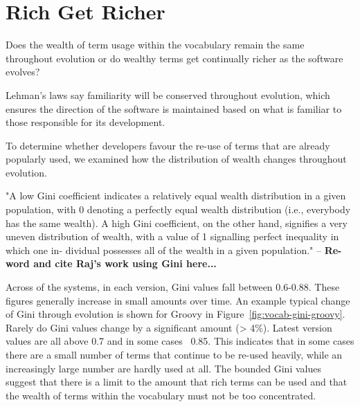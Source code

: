 

\section{Rich Get Richer} %
\label{sec:rich_get_richer}

Does the wealth of term usage within the vocabulary remain the same throughout evolution or do wealthy terms get continually richer as the software evolves?

Lehman's laws say familiarity will be conserved throughout evolution, which ensures the direction of the software is maintained based on what is familiar to those responsible for its development.



To determine whether developers favour the re-use of terms that are already popularly used, we examined how the distribution of wealth changes throughout evolution.



"A low Gini coefficient indicates a relatively equal wealth distribution in a given population, with 0 denoting a perfectly equal wealth distribution (i.e., everybody has the same wealth). A high Gini coefficient, on the other hand, signifies a very uneven distribution of wealth, with a value of 1 signalling perfect inequality in which one in- dividual possesses all of the wealth in a given population." -- \textbf{Re-word and cite Raj's work using Gini here...}

Across of the systems, in each version, Gini values fall between 0.6-0.88. These figures generally increase in small amounts over time. An example typical change of Gini through evolution is shown for Groovy in Figure~\ref{fig:vocab-gini-groovy}. Rarely do Gini values change by a significant amount (> 4\%). Latest version values are all above 0.7 and in some cases ~0.85. This indicates that in some cases there are a small number of terms that continue to be re-used heavily, while an increasingly large number are hardly used at all. The bounded Gini values suggest that there is a limit to the amount that rich terms can be used and that the wealth of terms within the vocabulary must not be too concentrated.

